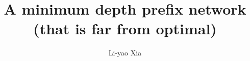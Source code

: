 \documentclass[11pt]{article}
\begin{document}
\title{A minimum depth prefix network (that is far from optimal)}

\author{Li-yao Xia}%

\maketitle




\newpage


\end{document}

